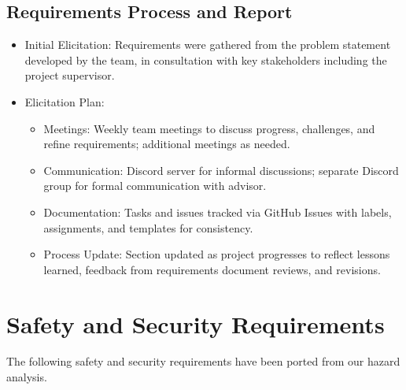 \documentclass{article}
\begin{document}
\subsection{Requirements Process and Report}\label{subsec:reqprocess}
\begin{itemize}
    \item {Initial Elicitation}: Requirements were gathered from the problem statement developed by the team, in consultation with key stakeholders including the project supervisor.
    \item {Elicitation Plan}:
    \begin{itemize}
        \item Meetings: Weekly team meetings to discuss progress, challenges, and refine requirements; additional meetings as needed.
        \item Communication: Discord server for informal discussions; separate Discord group for formal communication with advisor.
        \item Documentation: Tasks and issues tracked via GitHub Issues with labels, assignments, and templates for consistency.
        \item Process Update: Section updated as project progresses to reflect lessons learned, feedback from requirements document reviews, and revisions.
    \end{itemize}
\end{itemize}

\section*{Safety and Security Requirements}\label{sec:safety-and-security-requirements}

The following safety and security requirements have been ported from our hazard analysis. \newline
\end{document}
